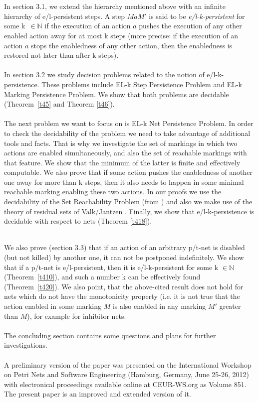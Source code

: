 \documentclass[a4paper]{llncs}
\begin{document}
\\ \\
In section 3.1, we extend the hierarchy mentioned above with an infinite hierarchy of e/l-persistent steps. A step $MaM'$ is said to be \emph{e/l-k-persistent} for some k~$\in \mathbb{N}$ if the execution of an action $a$ pushes the execution of any other enabled action away for at most k steps (more precise: if the execution of an action $a$ stops the enabledness of any other action, then the enabledness is restored not later than after k steps). 
\\ \\
In section 3.2 we study decision problems related to the notion of e/l-k-persistence. These problems include EL-k Step Persistence Problem and EL-k Marking Persistence Problem. We show that both problems are decidable (Theorem~\ref{t45} and Theorem \ref{t46}). 
\\ \\
The next problem we want to focus on is EL-k Net Persistence Problem. In order to check the decidability of the problem we need to take advantage of additional tools and facts.
That is why we investigate the set of markings in which two actions are enabled simultaneously, and also the set of reachable markings with that feature. We show that the minimum of the latter is finite and effectively computable. We also prove that if some action pushes the enabledness of another one away for more than k steps, then it also needs to happen in some minimal reachable marking enabling these two actions. In our proofs we use the decidability of the Set Reachability Problem (from \cite{BarOch}) and also we make use of the theory of residual sets of Valk/Jantzen \cite{ValkJantzen}. Finally, we show that e/l-k-persistence is decidable with respect to nets (Theorem \ref{t418}).


\mbox{ }\\
We also prove (section 3.3) that if an action of an arbitrary p/t-net is disabled (but not killed) by another one, it can not be postponed indefinitely. We show that if a p/t-net is e/l-persistent, then it is e/l-k-persistent for some k $\in \mathbb{N}$ (Theorem~\ref{t410}), and such a number k can be effectively found (Theorem~\ref{t420}). We also point, that the above-cited result does not hold for nets which do not have the monotonicity property (i.e. it is not true that the action enabled in some marking $M$ is also enabled in any marking $M'$ greater than $M$), for example for inhibitor nets.
\\ \\
The concluding section contains some questions and plans for further investigations.
\\ \\
A preliminary version of the paper was presented on the International Workshop on Petri Nets and Software Engineering (Hamburg, Germany, June 25-26, 2012) with electronical proceedings available online at CEUR-WS.org as Volume 851. The present paper is an improved and extended version of it.
\end{document}
